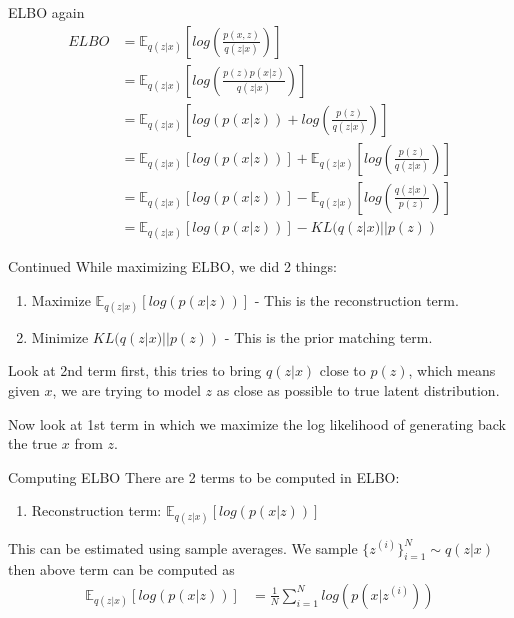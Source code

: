 \begin{frame}{ELBO again}
    \begin{align*}
        ELBO &= \mathbb{E}_{q(z|x)}[log\left(\frac{p(x,z)}{q(z|x)}\right)] \\
        &= \mathbb{E}_{q(z|x)}[log \left( \frac{p(z)p(x | z)}{q(z|x)} \right)] \\
        &= \mathbb{E}_{q(z|x)}[log(p(x|z)) + log\left(\frac{p(z)}{q(z|x)}\right)] \\
        &= \mathbb{E}_{q(z|x)}[log(p(x|z))] + \mathbb{E}_{q(z|x)}[log\left(\frac{p(z)}{q(z|x)}\right)] \\
        &= \mathbb{E}_{q(z|x)}[log(p(x|z))] - \mathbb{E}_{q(z|x)}[log\left(\frac{q(z|x)}{p(z)}\right)] \\
        &= \mathbb{E}_{q(z|x)}[log(p(x|z))] - KL(q(z|x) || p(z))
    \end{align*}
\end{frame}

\begin{frame}{Continued}
    While maximizing ELBO, we did 2 things:
    \begin{enumerate}
        \item Maximize $\mathbb{E}_{q(z|x)}[log(p(x|z))]$ - This is the reconstruction term.
        \item Minimize $KL(q(z|x) || p(z))$ - This is the prior matching term.
    \end{enumerate}

    \bigskip

    Look at 2nd term first, this tries to bring $q(z|x)$ close to $p(z)$, which means given $x$, we are trying to model $z$ as close as possible to true latent distribution. 

    \bigskip

    Now look at 1st term in which we maximize the log likelihood of generating back the true $x$ from $z$. 
\end{frame}

\begin{frame}{Computing ELBO}
    There are 2 terms to be computed in ELBO:
    \begin{enumerate}
        \item Reconstruction term: $\mathbb{E}_{q(z|x)}[log(p(x|z))]$
    \end{enumerate}

    This can be estimated using sample averages. We sample $\{z^{(i)}\}_{i=1}^{N} \sim q(z|x)$  then above term can be computed as 
    \begin{align*}
        \mathbb{E}_{q(z|x)}[log(p(x|z))] &= \frac{1}{N} \sum_{i=1}^{N} log(p(x|z^{(i)}))
    \end{align*}
\end{frame}


